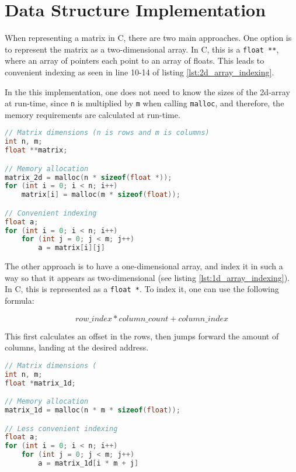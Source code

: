 \section{Data Structure Implementation} \label{sect:datastructure}

When representing a matrix in C, there are two main approaches. One option is to represent the matrix as a two-dimensional array. In C, this is a \texttt{float **}, where an array of pointers each point to an array of floats. This leads to convenient indexing as seen in line 10-14 of listing \ref{lst:2d_array_indexing}.

In the this implementation, one does not need to know the sizes of the 2d-array at run-time, since \texttt{n} is multiplied by \texttt{m} when calling \texttt{malloc}, and therefore, the memory requirements are calculated at run-time.

\begin{lstlisting}[language=C, caption={Allocation and indexing of a float **}, label={lst:2d_array_indexing}]
// Matrix dimensions (n is rows and m is columns)
int n, m;
float **matrix;

// Memory allocation
matrix_2d = malloc(n * sizeof(float *));
for (int i = 0; i < n; i++)
    matrix[i] = malloc(m * sizeof(float));

// Convenient indexing
float a;
for (int i = 0; i < n; i++)
    for (int j = 0; j < m; j++)
        a = matrix[i][j]
\end{lstlisting}

\noindent The other approach is to have a one-dimensional array, and index it in such a way so that it appears as two-dimensional (see listing \ref{lst:1d_array_indexing}). In C, this is represented as a \texttt{float *}. To index it, one can use the following formula: 

\[row\_index * column\_count + column\_index\]

This first calculates an offset in the rows, then jumps forward the amount of columns, landing at the desired address.

\begin{lstlisting}[language=C, caption={Allocation and indexing of a float *}, label={lst:1d_array_indexing}]
// Matrix dimensions (
int n, m;
float *matrix_1d;

// Memory allocation
matrix_1d = malloc(n * m * sizeof(float));

// Less convenient indexing
float a;
for (int i = 0; i < n; i++)
    for (int j = 0; j < m; j++)
        a = matrix_1d[i * m + j]
\end{lstlisting}

